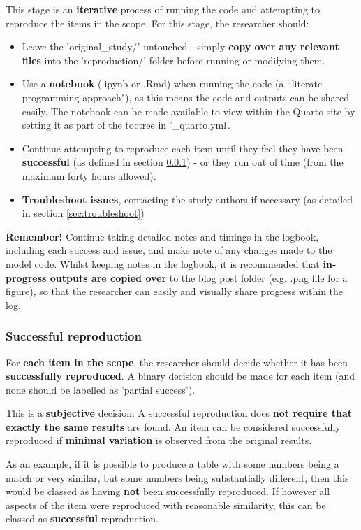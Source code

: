 This stage is an \textbf{iterative} process of running the code and attempting to reproduce the items in the scope. For this stage, the researcher should:
\begin{itemize}
    \item Leave the 'original\_study/' untouched - simply \textbf{copy over any relevant files} into the 'reproduction/' folder before running or modifying them.
    \item Use a \textbf{notebook} (.ipynb or .Rmd) when running the code (a ``literate programming approach"), as this means the code and outputs can be shared easily. The notebook can be made available to view within the Quarto site by setting it as part of the toctree in '\_quarto.yml'.
    \item Continue attempting to reproduce each item until they feel they have been \textbf{successful} (as defined in section \ref{sec:success}) - or they run out of time (from the maximum forty hours allowed).
    \item \textbf{Troubleshoot issues}, contacting the study authors if necessary (as detailed in section \ref{sec:troubleshoot})
\end{itemize}

\textbf{Remember!} Continue taking detailed notes and timings in the logbook, including each success and issue, and make note of any changes made to the model code. Whilst keeping notes in the logbook, it is recommended that \textbf{in-progress outputs are copied over} to the blog post folder (e.g. .png file for a figure), so that the researcher can easily and visually share progress within the log.

\vspace{0.5cm}
\subsubsection{Successful reproduction} \label{sec:success}

For \textbf{each item in the scope}, the researcher should decide whether it has been \textbf{successfully reproduced}. A binary decision should be made for each item (and none should be labelled as 'partial success').

This is a \textbf{subjective} decision. A successful reproduction does \textbf{not require that exactly the same results} are found. An item can be considered successfully reproduced if \textbf{minimal variation} is observed from the original results.

As an example, if it is possible to produce a table with some numbers being a match or very similar, but some numbers being substantially different, then this would be classed as having \textbf{not} been successfully reproduced. If however all aspects of the item were reproduced with reasonable similarity, this can be classed as \textbf{successful} reproduction.

